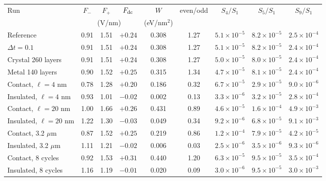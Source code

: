 \begin{tabular}{lcccccccc}
\hline\hline
Run & $F_-$ & $F_+$ & $F_{\rm dc}$ & $W$ & even/odd & $S_4/S_1$ & $S_5/S_1$ & $S_9/S_1$ \\
 & \multicolumn{3}{c}{(V/nm)} & (eV/nm$^2$) & & & & \\
\hline
Reference & 0.91 & 1.51 & $+0.24$ & 0.308 & 1.27 & $5.1\times10^{-5}$ & $8.2\times10^{-5}$ & $2.5\times10^{-4}$ \\
$\Delta t=0.1$ & 0.91 & 1.51 & $+0.24$ & 0.308 & 1.27 & $5.1\times10^{-5}$ & $8.2\times10^{-5}$ & $2.4\times10^{-4}$ \\
Crystal 260 layers & 0.91 & 1.51 & $+0.24$ & 0.308 & 1.27 & $5.0\times10^{-5}$ & $8.0\times10^{-5}$ & $2.4\times10^{-4}$ \\
Metal 140 layers & 0.90 & 1.52 & $+0.25$ & 0.315 & 1.34 & $4.7\times10^{-5}$ & $8.1\times10^{-5}$ & $2.4\times10^{-4}$ \\
\hline
Contact, $\ell=4$ nm & 0.78 & 1.28 & $+0.20$ & 0.186 & 0.32 & $6.7\times10^{-5}$ & $2.9\times10^{-5}$ & $9.0\times10^{-6}$ \\
Insulated, $\ell=4$ nm & 0.93 & 1.01 & $-0.02$ & 0.002 & 0.13 & $3.3\times10^{-6}$ & $3.2\times10^{-5}$ & $2.8\times10^{-4}$ \\
Contact, $\ell=20$ nm & 1.00 & 1.66 & $+0.26$ & 0.431 & 0.89 & $4.6\times10^{-5}$ & $1.6\times10^{-4}$ & $4.9\times10^{-3}$ \\
Insulated, $\ell=20$ nm & 1.22 & 1.30 & $-0.03$ & 0.049 & 0.34 & $9.2\times10^{-6}$ & $6.8\times10^{-5}$ & $9.1\times10^{-3}$ \\
\hline
Contact, 3.2 $\mu$m & 0.87 & 1.52 & $+0.25$ & 0.219 & 0.86 & $1.2\times10^{-4}$ & $7.9\times10^{-5}$ & $4.2\times10^{-5}$ \\
Insulated, 3.2 $\mu$m & 1.11 & 1.21 & $-0.02$ & 0.006 & 0.03 & $2.5\times10^{-6}$ & $3.5\times10^{-6}$ & $9.3\times10^{-6}$ \\
\hline
Contact, 8 cycles & 0.92 & 1.53 & $+0.31$ & 0.440 & 1.20 & $6.3\times10^{-5}$ & $9.5\times10^{-5}$ & $3.5\times10^{-4}$ \\
Insulated, 8 cycles & 1.16 & 1.19 & $-0.01$ & 0.020 & 0.09 & $3.0\times10^{-6}$ & $9.5\times10^{-5}$ & $3.0\times10^{-3}$ \\
\hline\hline
\end{tabular}
